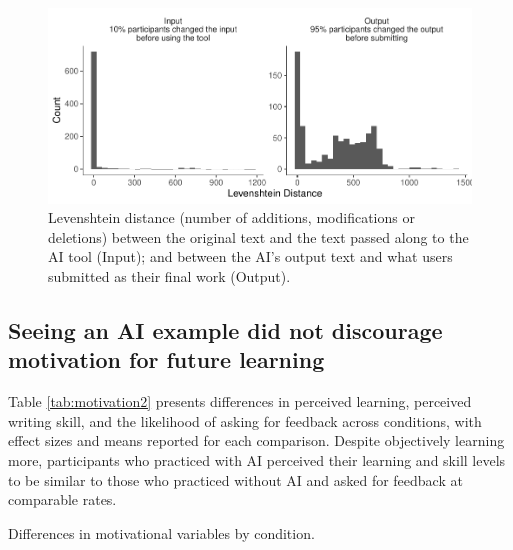 \documentclass[11pt]{report}
\begin{document}
\begin{append}
\begin{figure}[ht]
    \centering
    \includegraphics[width=0.95\linewidth]{levenshtein_distance.pdf}
    \caption{Levenshtein distance (number of additions, modifications or deletions) between the original text and the text passed along to the AI tool (Input); and between the AI's output text and what users submitted as their final work (Output).}
    \label{fig:distance}
\end{figure}

\subsection{Seeing an AI example did not discourage motivation for future learning}\label{sec:future_learning2}

Table \ref{tab:motivation2} presents differences in perceived learning, perceived writing skill, and the likelihood of asking for feedback across conditions, with effect sizes and means reported for each comparison. Despite objectively learning more, participants who practiced with AI perceived their learning and skill levels to be similar to those who practiced without AI and asked for feedback at comparable rates.

\begin{table}[ht]
    \centering
    \caption{Differences in motivational variables by condition.}


\end{table}
\end{append}
\end{document}
